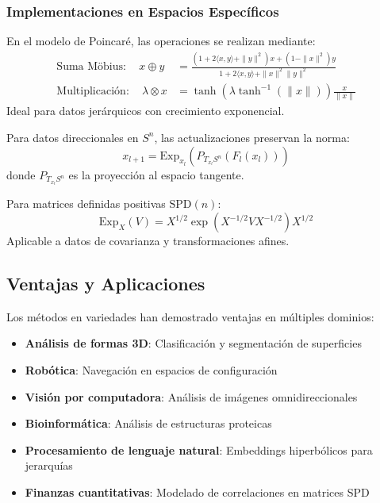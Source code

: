 \subsubsection{Implementaciones en Espacios Específicos}

\begin{example}
En el modelo de Poincaré, las operaciones se realizan mediante:
\begin{align}
\text{Suma Möbius}: \quad x \oplus y &= \frac{(1+2\langle x,y\rangle + \|y\|^2)x + (1-\|x\|^2)y}{1 + 2\langle x,y\rangle + \|x\|^2\|y\|^2} \\
\text{Multiplicación}: \quad \lambda \otimes x &= \tanh(\lambda \tanh^{-1}(\|x\|)) \frac{x}{\|x\|}
\end{align}
Ideal para datos jerárquicos con crecimiento exponencial.
\end{example}

\begin{example}[Esferas (\(S^n\))]
Para datos direccionales en \(S^n\), las actualizaciones preservan la norma:
\[
x_{l+1} = \text{Exp}_{x_l}(P_{T_{x_l}S^n}(F_l(x_l)))
\]
donde \(P_{T_{x_l}S^n}\) es la proyección al espacio tangente.
\end{example}

\begin{example}
Para matrices definidas positivas \(\text{SPD}(n)\):
\[
\text{Exp}_X(V) = X^{1/2} \exp(X^{-1/2}VX^{-1/2}) X^{1/2}
\]
Aplicable a datos de covarianza y transformaciones afines.
\end{example}

\subsection{Ventajas y Aplicaciones}

Los métodos en variedades han demostrado ventajas en múltiples dominios:

\begin{itemize}
    \item \textbf{Análisis de formas 3D}: Clasificación y segmentación de superficies
    \item \textbf{Robótica}: Navegación en espacios de configuración
    \item \textbf{Visión por computadora}: Análisis de imágenes omnidireccionales
    \item \textbf{Bioinformática}: Análisis de estructuras proteicas
    \item \textbf{Procesamiento de lenguaje natural}: Embeddings hiperbólicos para jerarquías
    \item \textbf{Finanzas cuantitativas}: Modelado de correlaciones en matrices SPD
\end{itemize}

